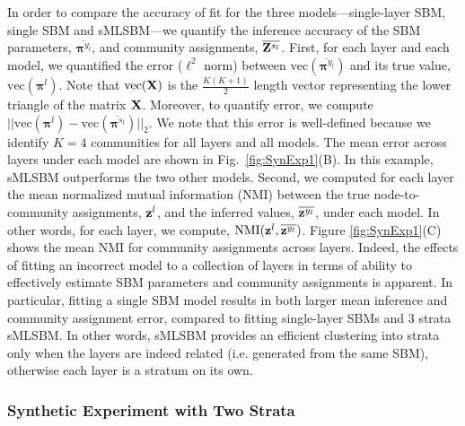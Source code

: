 {%
In order to compare the accuracy of fit for the three models---single-layer SBM, single SBM and sMLSBM---we quantify the inference accuracy of the SBM parameters, $\overline{{\boldsymbol \pi}^{y_{l}}}$, and community assignments, $\overline{{\bf Z}^{s_{l}}}$. 
%
First, for each layer and each model, we quantified the error ($\ell^{2}$ norm) between $\text{vec}(\overline{{\boldsymbol \pi}^{y_{l}}})$ and its true value, $\text{vec}({\boldsymbol \pi}^{l})$. Note that $\text{vec}({\bf X})$ is the $\frac{K(K+1)}{2}$ length vector representing the lower triangle of the matrix ${\bf X}$.  Moreover, to quantify error,
we compute $||\mbox{vec}({\boldsymbol \pi^{l}})-\text{vec}(\overline{{\boldsymbol \pi}^{s_{l}}})||_{2}$.  We note that this error is well-defined because we identify $K=4$ communities for all layers and all models. The mean error across layers under each model are shown in Fig.~\ref{fig:SynExp1}(B). In this example, sMLSBM outperforms the two other models.
%
Second, we computed for each layer the mean normalized mutual information (NMI) \cite{commdeccompare} between the true node-to-community assignments, ${\bf z}^{l}$, and the inferred values, $\overline{{\bf z}^{y_{l}}}$, under each model. In other words, for each layer, we compute, $\text{NMI}({\bf z}^{l},\overline{{\bf z}^{y_{l}}})$. Figure \ref{fig:SynExp1}(C) shows the mean NMI for community assignments across layers. Indeed, the effects of fitting an incorrect model to a collection of layers in terms of ability to effectively estimate SBM parameters and community assignments is apparent. In particular, fitting a single SBM model results in both larger mean inference and community assignment error, compared to fitting single-layer SBMs and 3 strata sMLSBM. In other words, sMLSBM provides an efficient clustering into strata only when the layers are indeed related (i.e. generated from the same SBM), otherwise each layer is a stratum on its own.

\subsubsection{Synthetic Experiment with Two Strata}\label{sec:2strata}

}
